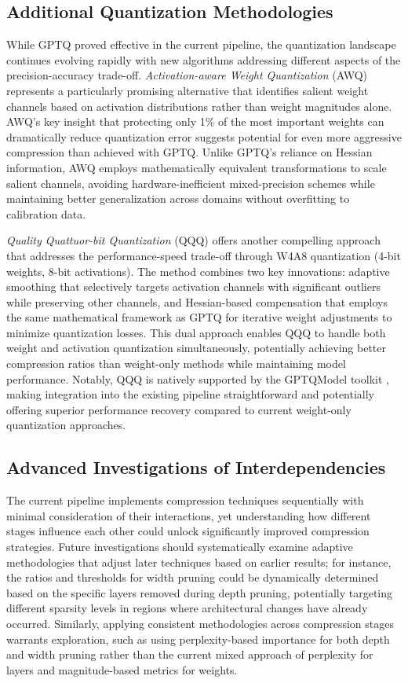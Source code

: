 \subsection{Additional Quantization Methodologies}

While GPTQ proved effective in the current pipeline, the quantization landscape continues evolving rapidly with new algorithms addressing different aspects of the precision-accuracy trade-off. \textit{Activation-aware Weight Quantization} (AWQ) \cite{awq} represents a particularly promising alternative that identifies salient weight channels based on activation distributions rather than weight magnitudes alone. AWQ's key insight that protecting only 1\% of the most important weights can dramatically reduce quantization error suggests potential for even more aggressive compression than achieved with GPTQ. Unlike GPTQ's reliance on Hessian information, AWQ employs mathematically equivalent transformations to scale salient channels, avoiding hardware-inefficient mixed-precision schemes while maintaining better generalization across domains without overfitting to calibration data.

\textit{Quality Quattuor-bit Quantization} (QQQ) \cite{qqq} offers another compelling approach that addresses the performance-speed trade-off through W4A8 quantization (4-bit weights, 8-bit activations). The method combines two key innovations: adaptive smoothing that selectively targets activation channels with significant outliers while preserving other channels, and Hessian-based compensation that employs the same mathematical framework as GPTQ for iterative weight adjustments to minimize quantization losses. This dual approach enables QQQ to handle both weight and activation quantization simultaneously, potentially achieving better compression ratios than weight-only methods while maintaining model performance. Notably, QQQ is natively supported by the GPTQModel toolkit \cite{gptqmodel}, making integration into the existing pipeline straightforward and potentially offering superior performance recovery compared to current weight-only quantization approaches.

\subsection{Advanced Investigations of Interdependencies}
The current pipeline implements compression techniques sequentially with minimal consideration of their interactions, yet understanding how different stages influence each other could unlock significantly improved compression strategies. Future investigations should systematically examine adaptive methodologies that adjust later techniques based on earlier results; for instance, the ratios and thresholds for width pruning could be dynamically determined based on the specific layers removed during depth pruning, potentially targeting different sparsity levels in regions where architectural changes have already occurred. Similarly, applying consistent methodologies across compression stages warrants exploration, such as using perplexity-based importance for both depth and width pruning rather than the current mixed approach of perplexity for layers and magnitude-based metrics for weights.

